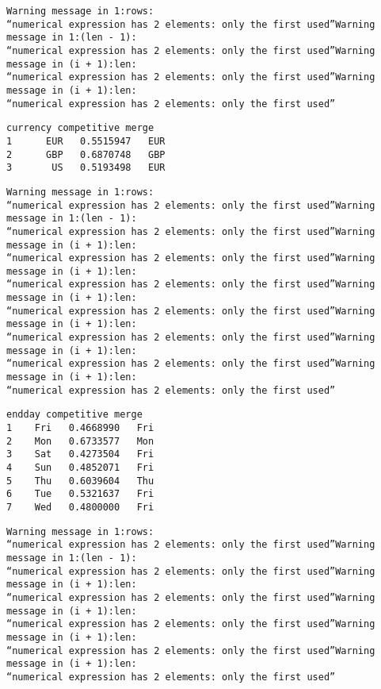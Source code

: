 \documentclass[11pt]{article}
\begin{document}
    \begin{Verbatim}[commandchars=\\\{\}]
Warning message in 1:rows:
“numerical expression has 2 elements: only the first used”Warning message in 1:(len - 1):
“numerical expression has 2 elements: only the first used”Warning message in (i + 1):len:
“numerical expression has 2 elements: only the first used”Warning message in (i + 1):len:
“numerical expression has 2 elements: only the first used”
    \end{Verbatim}

    \begin{Verbatim}[commandchars=\\\{\}]
  currency competitive merge
1      EUR   0.5515947   EUR
2      GBP   0.6870748   GBP
3       US   0.5193498   EUR

    \end{Verbatim}

    \begin{Verbatim}[commandchars=\\\{\}]
Warning message in 1:rows:
“numerical expression has 2 elements: only the first used”Warning message in 1:(len - 1):
“numerical expression has 2 elements: only the first used”Warning message in (i + 1):len:
“numerical expression has 2 elements: only the first used”Warning message in (i + 1):len:
“numerical expression has 2 elements: only the first used”Warning message in (i + 1):len:
“numerical expression has 2 elements: only the first used”Warning message in (i + 1):len:
“numerical expression has 2 elements: only the first used”Warning message in (i + 1):len:
“numerical expression has 2 elements: only the first used”Warning message in (i + 1):len:
“numerical expression has 2 elements: only the first used”
    \end{Verbatim}

    \begin{Verbatim}[commandchars=\\\{\}]
  endday competitive merge
1    Fri   0.4668990   Fri
2    Mon   0.6733577   Mon
3    Sat   0.4273504   Fri
4    Sun   0.4852071   Fri
5    Thu   0.6039604   Thu
6    Tue   0.5321637   Fri
7    Wed   0.4800000   Fri

    \end{Verbatim}

    \begin{Verbatim}[commandchars=\\\{\}]
Warning message in 1:rows:
“numerical expression has 2 elements: only the first used”Warning message in 1:(len - 1):
“numerical expression has 2 elements: only the first used”Warning message in (i + 1):len:
“numerical expression has 2 elements: only the first used”Warning message in (i + 1):len:
“numerical expression has 2 elements: only the first used”Warning message in (i + 1):len:
“numerical expression has 2 elements: only the first used”Warning message in (i + 1):len:
“numerical expression has 2 elements: only the first used”
    \end{Verbatim}
\end{document}

